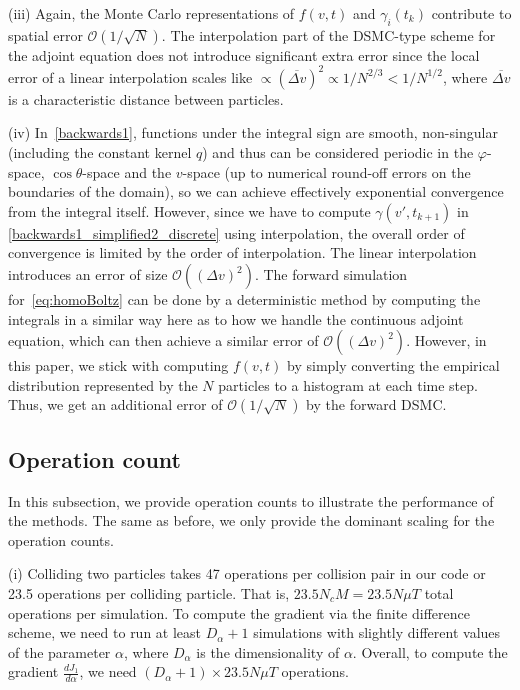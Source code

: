 \documentclass[times,final,nopreprintline]{elsarticle}
\newcommand{\cO}{\mathcal O} \newcommand{\cP}{\mathcal P}
\begin{document}
(iii) Again, the Monte Carlo representations of $f(v,t)$ and $\gamma_i(t_k)$ contribute to spatial error $\cO(1/\sqrt{N})$. The interpolation part of the DSMC-type scheme for the adjoint equation does not introduce significant extra error since the local error of a linear interpolation scales like $\propto (\overline{\Delta v})^2 \propto 1/N^{2/3} < 1/N^{1/2}$, where $\overline{\Delta v}$ is a characteristic distance between particles.    

(iv) In~\eqref{backwards1}, functions under the integral sign are smooth, non-singular (including the constant kernel $q$) and thus can be considered periodic in the $\varphi$-space, $\cos\theta$-space and the $v$-space (up to numerical round-off errors on the boundaries of the domain), so we can achieve effectively exponential convergence from the integral itself. However, since we have to compute $\gamma(v',t_{k+1})$ in \eqref{backwards1_simplified2_discrete} using interpolation, the overall order of convergence is limited by the order of interpolation. The linear interpolation introduces an error of size $\cO((\Delta v)^2)$. The forward simulation for~\eqref{eq:homoBoltz} can be done by a deterministic method by computing the integrals in a similar way here as to how we handle the continuous adjoint equation, which can then achieve a similar error of $\cO((\Delta v)^2)$. However, in this paper, we stick with computing $f(v,t)$ by simply converting the empirical distribution represented by the $N$ particles to a histogram at each time step. Thus, we get an additional error of $\cO(1/\sqrt{N})$ by the forward DSMC.




\subsection{Operation count}
In this subsection, we provide operation counts to illustrate the performance of the methods. The same as before, we only provide the dominant scaling for the operation counts.

(i) Colliding two particles takes 47 operations per collision pair in our code or 23.5 operations per colliding particle. That is, $23.5N_c M = 23.5 N\mu T$ total operations per simulation. To compute the gradient via the finite difference scheme, we need to run at least $D_\alpha+1$ simulations with slightly different values of the parameter $\alpha$, where $D_\alpha$ is the dimensionality of $\alpha$. Overall, to compute the gradient $\frac{d J_1}{d \alpha}$, we need $(D_\alpha+1) \times 23.5 N\mu T$ operations.
\end{document}
